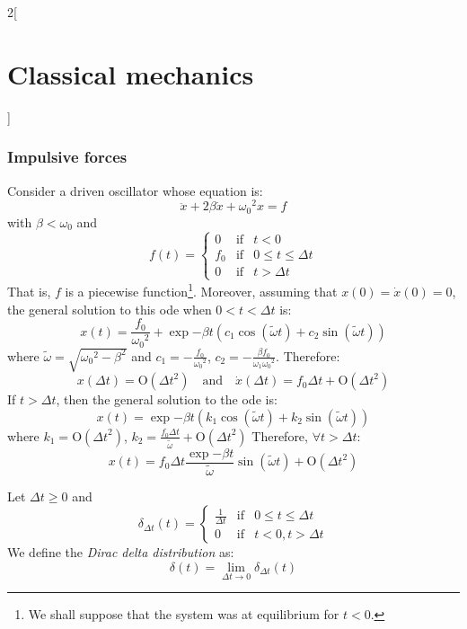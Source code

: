 \documentclass[../../../main.tex]{subfiles}
\begin{document}
\begin{multicols}{2}[\section{Classical mechanics}]
  \subsubsection{Impulsive forces}
  \begin{proposition}
    Consider a driven oscillator whose equation is:
    \begin{equation}\label{CM_impulse}
      \ddot{x}+2\beta\dot{x}+{\omega_0}^2x=f
    \end{equation}
    with $\beta<\omega_0$ and $$f(t)=\left\{
      \begin{array}{ccc}
        0   & \text{if} & t<0                  \\
        f_0 & \text{if} & 0\leq t\leq \Delta t \\
        0   & \text{if} & t>\Delta t
      \end{array}\right.$$
    That is, $f$ is a piecewise function\footnote{We shall suppose that the system was at equilibrium for $t<0$.}. Moreover, assuming that $x(0)=\dot{x}(0)=0$, the general solution to this ode when $0<t<\Delta t$ is:
    $$x(t)=\frac{f_0}{{\omega_0}^2}+\exp{-\beta t}\left(c_1\cos(\tilde{\omega}t)+c_2\sin(\tilde{\omega}t)\right)$$
    where $\tilde{\omega}=\sqrt{{\omega_0}^2-\beta^2}$ and $c_1=-\frac{f_0}{{\omega_0}^2}$, $c_2=-\frac{\beta f_0}{\omega_1{\omega_0}^2}$.
    Therefore: $$x(\Delta t)=\text{O}({\Delta t}^2)\quad\text{and}\quad\dot{x}(\Delta t)=f_0\Delta t+\text{O}({\Delta t}^2)$$
    If $t>\Delta t$, then the general solution to the ode is:
    $$x(t)=\exp{-\beta t}\left(k_1\cos(\tilde{\omega}t)+k_2\sin(\tilde{\omega}t)\right)$$ where $k_1=\text{O}({\Delta t}^2)$, $k_2=\frac{f_0\Delta t}{\tilde{\omega}}+\text{O}({\Delta t}^2)$
    Therefore, $\forall t>\Delta t$: $$x(t)=f_0\Delta t\frac{\exp{-\beta t}}{\tilde{\omega}}\sin(\tilde{\omega}t)+\text{O}({\Delta t}^2)$$
  \end{proposition}
  \begin{definition}
    Let $\Delta t\geq 0$ and $$\delta_{\Delta t}(t)=\left\{
      \begin{array}{ccc}
        \frac{1}{\Delta t} & \text{if} & 0\leq t\leq \Delta t \\
        0                  & \text{if} & t<0,t>\Delta t
      \end{array}\right.
    $$
    We define the \emph{Dirac delta distribution} as: $$\delta(t)=\lim_{\Delta t\to 0}\delta_{\Delta t}(t)$$
  \end{definition}
  \begin{proposition}

\end{proposition}
\end{multicols}
\end{document}
